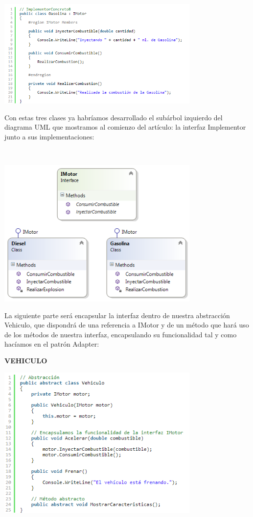 \begin{flushleft}
\begin{itemize}
\begin{center}
	\includegraphics[width=10cm]{./Imagenes/bridge6} 
	\end{center}

Con estas tres clases ya habríamos desarrollado el subárbol izquierdo del diagrama UML que mostramos al comienzo del artículo: la interfaz Implementor junto a sus implementaciones:

\textbf{}\\
\begin{center}
	\includegraphics[width=10cm]{./Imagenes/bridge7} 
	\end{center}

La siguiente parte será encapsular la interfaz dentro de nuestra abstracción Vehiculo, que dispondrá de una referencia a IMotor y de un método que hará uso de los métodos de nuestra interfaz, encapsulando su funcionalidad tal y como hacíamos en el patrón Adapter:
\textbf{}\\
\begin{center}
\textbf {VEHICULO}
	\end{center}

\begin{center}
	\includegraphics[width=10cm]{./Imagenes/bridge8} 
	\end{center}


\end{itemize}
\end{flushleft}
